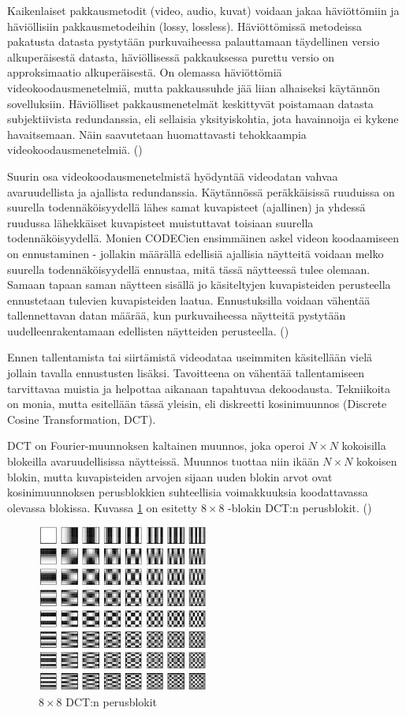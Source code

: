 Kaikenlaiset pakkausmetodit (video, audio, kuvat) voidaan jakaa häviöttömiin
ja häviöllisiin pakkausmetodeihin (lossy, lossless). Häviöttömissä metodeissa pakatusta datasta
pystytään purkuvaiheessa palauttamaan täydellinen versio alkuperäisestä
datasta, häviöllisessä pakkauksessa purettu versio on approksimaatio
alkuperäisestä. On olemassa häviöttömiä videokoodausmenetelmiä, mutta
pakkaussuhde jää liian alhaiseksi käytännön sovelluksiin. Häviölliset
pakkausmenetelmät keskittyvät poistamaan datasta subjektiivista redundanssia,
eli sellaisia yksityiskohtia, jota havainnoija ei kykene havaitsemaan. Näin
saavutetaan huomattavasti tehokkaampia videokoodausmenetelmiä. (\cite{h264})

Suurin osa videokoodausmenetelmistä hyödyntää videodatan vahvaa
avaruudellista ja ajallista redundanssia. Käytännössä peräkkäisissä
ruuduissa on suurella todennäköisyydellä lähes samat kuvapisteet (ajallinen) ja
yhdessä ruudussa lähekkäiset kuvapisteet muistuttavat toisiaan suurella
todennäköisyydellä. Monien CODECien ensimmäinen askel videon koodaamiseen
on ennustaminen - jollakin määrällä edellisiä ajallisia näytteitä voidaan
melko suurella todennäköisyydellä ennustaa, mitä tässä näytteessä tulee
olemaan. Samaan tapaan saman näytteen sisällä jo käsiteltyjen kuvapisteiden
perusteella ennustetaan tulevien kuvapisteiden laatua. Ennustuksilla voidaan
vähentää tallennettavan datan määrää, kun purkuvaiheessa näytteitä pystytään
uudelleenrakentamaan edellisten näytteiden perusteella. (\cite{h264})

Ennen tallentamista tai siirtämistä videodataa useimmiten käsitellään vielä
jollain tavalla ennustusten lisäksi. Tavoitteena on vähentää tallentamiseen
tarvittavaa muistia ja helpottaa aikanaan tapahtuvaa dekoodausta. Tekniikoita
on monia, mutta esitellään tässä yleisin, eli diskreetti kosinimuunnos
(Discrete Cosine Transformation, DCT). 

DCT on Fourier-muunnoksen kaltainen muunnos, joka operoi $N \times N$
kokoisilla blokeilla avaruudellisissa näytteissä. Muunnos tuottaa niin
ikään $N \times N$ kokoisen blokin, mutta kuvapisteiden arvojen sijaan
uuden blokin arvot ovat kosinimuunnoksen perusblokkien suhteellisia
voimakkuuksia koodattavassa olevassa blokissa. Kuvassa \ref{fig:dct} on esitetty
$8  \times 8$ -blokin DCT:n perusblokit. (\cite{h264})

\begin{figure}[ht]
	\centering
	\includegraphics[width=0.5\textwidth]{dct.jpg}
	\caption{$8 \times 8$ DCT:n perusblokit}
	\label{fig:dct}
\end{figure}

